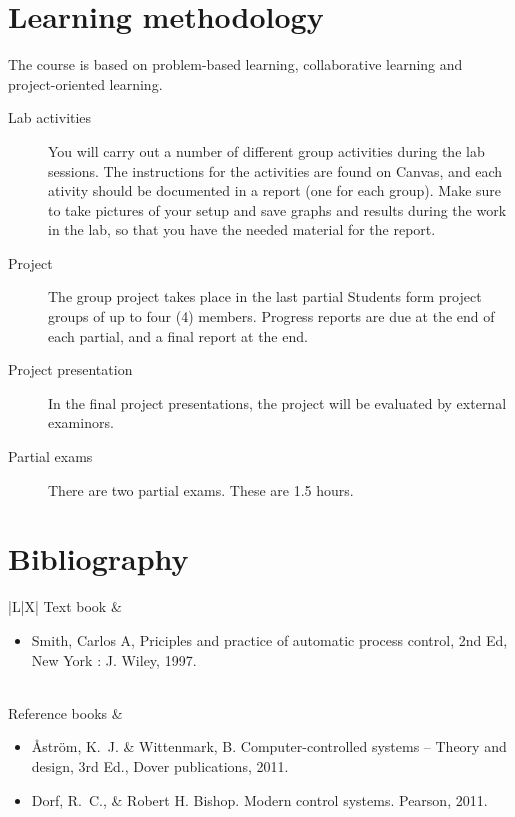 \documentclass[letter, 10pt]{scrartcl}
\begin{document}
\section*{Learning methodology}
The course is based on problem-based learning, collaborative learning and project-oriented learning.
\begin{description}
\item[Lab activities] You will carry out a number of different group activities during the lab sessions. The instructions for the activities are found on Canvas, and each ativity should be documented in a report (one for each group). Make sure to take pictures of your setup and save graphs and results during the work in the lab, so that you have the needed material for the report.
\item[Project] The group project takes place in the last partial Students form project groups of up to four (4) members. Progress reports are due at the end of each partial, and a final report at the end.
\item[Project presentation] In the final project presentations, the project will be evaluated by external examinors. 
\item[Partial exams] There are two partial exams. These are 1.5 hours. 
\end{description}

\section*{Bibliography}

\begin{tabularx}{\linewidth}{|L|X|}
\hline
Text book
& \begin{minipage}[t]{\linewidth}
\begin{itemize}[noitemsep] 
\item Smith, Carlos A, Priciples and practice of automatic process control, 2nd Ed, New York : J. Wiley, 1997.
\end{itemize}
\end{minipage}\\\hline
Reference books
& 
\begin{minipage}[t]{\linewidth}
\begin{itemize}[noitemsep] 
\item Åström, K.~J. \& Wittenmark, B. Computer-controlled systems – Theory and design, 3rd Ed., Dover publications, 2011.\\
\item Dorf, R.~C., \& Robert H. Bishop. Modern control systems. Pearson, 2011.
\end{itemize}
\end{minipage} \\\hline
\end{tabularx}
\end{document}
